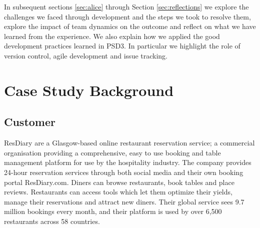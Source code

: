 \documentclass{l3proj}
\begin{document}
In subsequent sections \ref{sec:alice} through Section \ref{sec:reflections} we explore the challenges we faced through development and the steps we took to resolve them, explore the impact of team dynamics on the outcome and reflect on what we have learned from the experience. We also explain how we applied the good development practices learned in PSD3. In particular we highlight the role of version control, agile development and issue tracking.

\newpage


\section{Case Study Background}
\label{sec:background}

\subsection{Customer}
\label{sec:customer}



ResDiary are a Glasgow-based online restaurant reservation service; a commercial organisation providing a comprehensive, easy to use booking and table management platform for use by the hospitality industry. The company provides 24-hour reservation services through both social media and their own booking portal ResDiary.com. Diners can browse restaurants, book tables and place reviews. Restaurants can access tools which let them optimize their yields, manage their reservations and attract new diners. Their global service sees 9.7 million bookings every month, and their platform is used by over 6,500 restaurants across 58 countries. 
\end{document}
